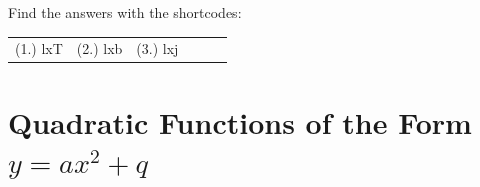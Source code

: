   \label{m39338**end}
\par {} Find the answers with the shortcodes:
 \par \begin{tabular}[h]{cccccc}
 (1.) lxT  &  (2.) lxb  &  (3.) lxj  & \end{tabular}
% 
%     
%     
%     
   \par 
      \label{m39345*uid101}
            \section{ Quadratic Functions of the Form $y=a{x}^{2}+q$}
            \nopagebreak
